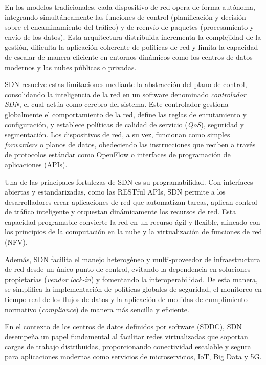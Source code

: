 {        En los modelos tradicionales, cada dispositivo de red opera de forma autónoma, integrando simultáneamente las funciones de control (planificación y decisión sobre el encaminamiento del tráfico) y de reenvío de paquetes (procesamiento y envío de los datos). Esta arquitectura distribuida incrementa la complejidad de la gestión, dificulta la aplicación coherente de políticas de red y limita la capacidad de escalar de manera eficiente en entornos dinámicos como los centros de datos modernos y las nubes públicas o privadas.
        
        SDN resuelve estas limitaciones mediante la abstracción del plano de control, consolidando la inteligencia de la red en un software denominado \textit{controlador SDN}, el cual actúa como cerebro del sistema. Este controlador gestiona globalmente el comportamiento de la red, define las reglas de enrutamiento y configuración, y establece políticas de calidad de servicio (\textit{QoS}), seguridad y segmentación. Los dispositivos de red, a su vez, funcionan como simples \textit{forwarders} o planos de datos, obedeciendo las instrucciones que reciben a través de protocolos estándar como OpenFlow o interfaces de programación de aplicaciones (APIs).
        
        Una de las principales fortalezas de SDN es su programabilidad. Con interfaces abiertas y estandarizadas, como las RESTful APIs, SDN permite a los desarrolladores crear aplicaciones de red que automatizan tareas, aplican control de tráfico inteligente y orquestan dinámicamente los recursos de red. Esta capacidad programable convierte la red en un recurso ágil y flexible, alineado con los principios de la computación en la nube y la virtualización de funciones de red (NFV).
        
        Además, SDN facilita el manejo heterogéneo y multi-proveedor de infraestructura de red desde un único punto de control, evitando la dependencia en soluciones propietarias (\textit{vendor lock-in}) y fomentando la interoperabilidad. De esta manera, se simplifica la implementación de políticas globales de seguridad, el monitoreo en tiempo real de los flujos de datos y la aplicación de medidas de cumplimiento normativo (\textit{compliance}) de manera más sencilla y eficiente.
        
        En el contexto de los centros de datos definidos por software (SDDC), SDN desempeña un papel fundamental al facilitar redes virtualizadas que soportan cargas de trabajo distribuidas, proporcionando conectividad escalable y segura para aplicaciones modernas como servicios de microservicios, IoT, Big Data y 5G.
        
}
